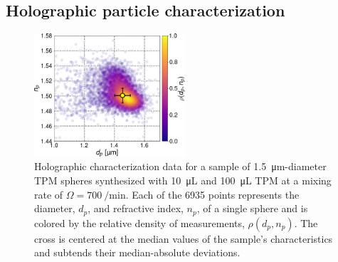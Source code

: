 \documentclass[journal=langd5,manuscript=article]{achemso}
\begin{document}
\subsection{Holographic particle characterization}
\label{sec:holographicparticlecharacterization}

\begin{figure}[!b]
    \centering
    \includegraphics[width=0.5\textwidth]{distribution03}
    \caption{Holographic characterization data for a sample
    of \SI{1.5}{\um}-diameter TPM spheres synthesized with
    \SI{10}{\micro\liter}  and 
    \SI{100}{\micro\liter} TPM at a mixing rate
    of $\Omega = \SI{700}{\per\minute}$.  Each 
    of the \num{6935} points
    represents the diameter, $d_p$, and refractive index,
    $n_p$, of a single sphere and is colored by the relative
    density of measurements, $\rho(d_p, n_p)$.
    The cross is centered at the median values of the sample's
    characteristics and subtends their 
    median-absolute deviations.}
    \label{fig:typicalcharacterization}
\end{figure}
\end{document}
